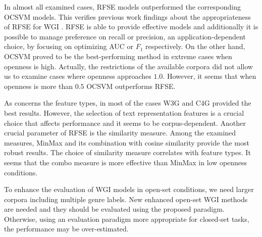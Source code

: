 \documentclass[runningheads]{llncs}
\begin{document}
In almost all examined cases, RFSE models outperformed the corresponding OCSVM models. This verifies previous work findings about the appropriateness of RFSE for WGI \citep{pritsos2013open}. RFSE is able to provide effective models and additionally it is possible to manage preference on recall or precision, an application-dependent choice, by focusing on optimizing AUC or $F_1$ respectively. On the other hand, OCSVM proved to be the best-performing method in extreme cases when openness is high. Actually, the restrictions of the available corpora did not allow us to examine cases where openness approaches $1.0$. However, it seems that when openness is more than $0.5$ OCSVM outperforms RFSE.

As concerns the feature types, in most of the cases W3G and C4G provided the best results. However, the selection of text representation features is a crucial choice that affects performance and it seems to be corpus-dependent. Another crucial parameter of RFSE is the similarity measure. Among the examined measures, MinMax and its combination with cosine similarity provide the most robust results. The choice of similarity measure correlates with feature types. It seems that the combo measure is more effective than MinMax in low openness conditions.

To enhance the evaluation of WGI models in open-set conditions, we need larger corpora including multiple genre labels. New enhanced open-set WGI methods are needed and they should be evaluated using the proposed paradigm. Otherwise, using an evaluation paradigm more appropriate for closed-set tasks, the performance may be over-estimated.



\end{document}
